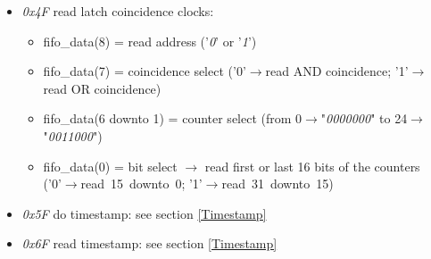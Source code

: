 \begin{itemize}
	\item \textit{0x4F} read latch coincidence clocks:
	\begin{itemize}
		\item fifo\_data(8) = read address ('\textit{0}' or '\textit{1}')
		\item fifo\_data(7) = coincidence select ('0'$\rightarrow$read AND coincidence; '1'$\rightarrow$read OR coincidence)
		\item fifo\_data(6 downto 1) = counter select (from 0$\rightarrow$"\textit{0000000}" to 24$\rightarrow$"\textit{0011000}")
		\item fifo\_data(0) = bit select $\rightarrow$ read first or last 16 bits of the counters \\('0'$\rightarrow$read~15~downto~0; '1'$\rightarrow$read~31~downto~15)
	\end{itemize}
	\item \textit{0x5F} do timestamp: see section \ref{Timestamp}
	\item \textit{0x6F} read timestamp: see section \ref{Timestamp}
\end{itemize}

